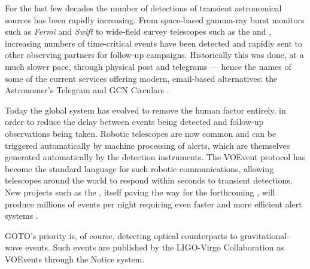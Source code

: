\begin{colsection}

For the last few decades the number of detections of transient astronomical sources has been rapidly increasing. From space-based gamma-ray burst monitors such as \textit{Fermi} and \textit{Swift} to wide-field survey telescopes such as the  and , increasing numbers of time-critical events have been detected and rapidly sent to other observing partners for follow-up campaigns. Historically this was done, at a much slower pace, through physical post and telegrams --- hence the names of some of the current services offering modern, email-based alternatives: the Astronomer's Telegram \citep{ATel} and GCN Circulars \citep{GCN}.

Today the global system has evolved to remove the human factor entirely, in order to reduce the delay between events being detected and follow-up observations being taken. Robotic telescopes are now common and can be triggered automatically by machine processing of alerts, which are themselves generated automatically by the detection instruments. The  VOEvent protocol \citep{voevent} has become the standard language for such robotic communications, allowing telescopes around the world to respond within seconds to transient detections. New projects such as the , itself paving the way for the forthcoming , will produce millions of events per night requiring even faster and more efficient alert systems \citep{ZTF_alerts}.

GOTO's priority is, of course, detecting optical counterparts to gravitational-wave events. Such events are published by the LIGO-Virgo Collaboration as VOEvents through the  Notice system.

\newpage

\end{colsection}


